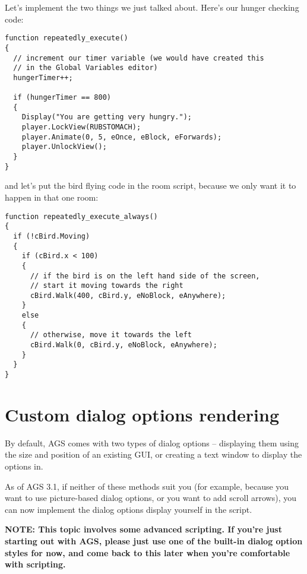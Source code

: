 Let's implement the two things we just talked about. Here's our hunger checking code:
\begin{verbatim}
function repeatedly_execute()
{
  // increment our timer variable (we would have created this
  // in the Global Variables editor)
  hungerTimer++;

  if (hungerTimer == 800)
  {
    Display("You are getting very hungry.");
    player.LockView(RUBSTOMACH);
    player.Animate(0, 5, eOnce, eBlock, eForwards);
    player.UnlockView();
  }
}
\end{verbatim}
and let's put the bird flying code in the room script, because we only want it to happen in that one room:
\begin{verbatim}
function repeatedly_execute_always()
{
  if (!cBird.Moving)
  {
    if (cBird.x < 100)
    {
      // if the bird is on the left hand side of the screen,
      // start it moving towards the right
      cBird.Walk(400, cBird.y, eNoBlock, eAnywhere);
    }
    else
    {
      // otherwise, move it towards the left
      cBird.Walk(0, cBird.y, eNoBlock, eAnywhere);
    }
  }
}
\end{verbatim}


\section{Custom dialog options rendering}\label{CustomDialogOptions}%

By default, AGS comes with two types of dialog options -- displaying them using the size
and position of an existing GUI, or creating a text window to display the options in.

As of AGS 3.1, if neither of these methods suit you (for example, because you want to
use picture-based dialog options, or you want to add scroll arrows), you can now implement
the dialog options display yourself in the script.

\bf{NOTE:} This topic involves some advanced scripting. If you're just starting out with AGS,
please just use one of the built-in dialog option styles for now, and come back to this later
when you're comfortable with scripting.


